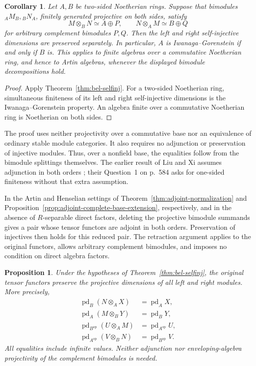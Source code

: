 \documentclass[12pt,a4paper,english,reqno]{amsart}
\numberwithin{equation}{section}
\theoremstyle{plain}
\newtheorem{proposition}[theorem]{Proposition}
\newtheorem{corollary}[theorem]{Corollary}
\theoremstyle{definition}
\begin{document}
\begin{corollary}
\label{cor:bel-artin-selfinj}
\label{cor:bel-noetherian-selfinj}
Let $A,B$ be two-sided Noetherian rings.  Suppose that bimodules
$ {}_AM_B,{}_BN_A$, finitely generated projective on both sides, satisfy
\[
 M\otimes_BN\simeq A\oplus P,
 \qquad N\otimes_AM\simeq B\oplus Q
\]
for arbitrary complement bimodules $P,Q$.  Then the left and right
self-injective dimensions are preserved separately.  In particular,
$A$ is Iwanaga--Gorenstein if and only if $B$ is.  This applies to
finite algebras over a commutative Noetherian ring, and hence to
Artin algebras, whenever the displayed bimodule decompositions hold.
\end{corollary}

\begin{proof}
Apply Theorem~\ref{thm:bel-selfinj}.  For a two-sided Noetherian ring,
simultaneous finiteness of its left and right self-injective dimensions
is the Iwanaga--Gorenstein property.  An algebra finite over a
commutative Noetherian ring is Noetherian on both sides.
\end{proof}

The proof uses neither projectivity over a commutative base nor an equivalence of
ordinary stable module categories.  It also requires no adjunction or
preservation of injective modules.  Thus, over a nonfield base, the
equalities follow from the bimodule splittings themselves.  The earlier result of Liu
and Xi assumes adjunction in both orders
\cite[Proposition~4.1, p.~579]{bel-LiuXi2007}; their Question~1 on
p.~584 asks for one-sided finiteness without that extra assumption.

In the Artin and Henselian settings of
Theorem~\ref{thm:adjoint-normalization} and
Proposition~\ref{prop:adjoint-complete-base-extension}, respectively,
and in the absence of $R$-separable direct factors, deleting the
projective bimodule summands gives a pair whose tensor functors are
adjoint in both orders.
Preservation of injectives then holds for this reduced pair.  The
retraction argument applies to the original functors, allows arbitrary
complement bimodules, and imposes no condition on direct algebra factors.

\begin{proposition}
\label{prop:bel-projective-dimensions}
Under the hypotheses of Theorem~\ref{thm:bel-selfinj}, the original
tensor functors preserve the projective dimensions of all left and
right modules.  More precisely,
\[
\begin{aligned}
 \operatorname{pd}_B(N\otimes_AX)&=\operatorname{pd}_A X,\\
 \operatorname{pd}_A(M\otimes_BY)&=\operatorname{pd}_B Y,\\
 \operatorname{pd}_{B^{\mathrm{op}}}(U\otimes_AM)
   &=\operatorname{pd}_{A^{\mathrm{op}}}U,\\
 \operatorname{pd}_{A^{\mathrm{op}}}(V\otimes_BN)
   &=\operatorname{pd}_{B^{\mathrm{op}}}V .
\end{aligned}
\]
All equalities include infinite values.  Neither adjunction nor
enveloping-algebra projectivity of the complement bimodules is needed.
\end{proposition}
\end{document}
